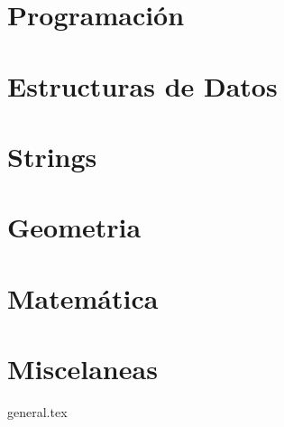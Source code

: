 \documentclass{article}
\begin{document}
\tableofcontents

\pagebreak

\section{Programación}

\pagebreak

\pagebreak

\section{Estructuras de Datos}

\pagebreak

\section{Strings}

\pagebreak

\section{Geometria}

\pagebreak

\section{Matemática}

\pagebreak

\pagebreak

\pagebreak
%

\section{Miscelaneas}
{general.tex}
\pagebreak

\listoftodos[TODOs]
\end{document}
